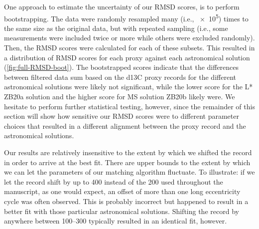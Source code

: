 \documentclass[draft]{agujournal2019}
\begin{document}
One approach to estimate the uncertainty of our \gls{RMSD} scores, is to perform bootstrapping.
The data were randomly resampled many (i.e., \num{e5}) times to the same size as the original data, but with repeated sampling (i.e., some measurements were included twice or more while others were excluded randomly).
Then, the \gls{RMSD} scores were calculated for each of these subsets.
This resulted in a distribution of \gls{RMSD} scores for each proxy against each astronomical solution (\cref{fig:full-RMSD-boot}).
The bootstrapped scores indicate that the differences between filtered data sum based on the \gls{d13C} proxy records for the different astronomical solutions were likely not significant,
while the lower score for the \gls{L*} ZB20a solution
and the higher score for \gls{MS} solution ZB20b
likely were.
We hesitate to perform further statistical testing, however, since the remainder of this section will show how sensitive our \gls{RMSD} scores were to different parameter choices that resulted in a different alignment between the proxy record and the astronomical solutions.

Our results are relatively insensitive to the extent by which we shifted the record in order to arrive at the best fit.
There are upper bounds to the extent by which we can let the parameters of our matching algorithm fluctuate.
To illustrate: if we let the record shift by up to \qty{400}{\kiloyear} instead of the \qty{200}{\kiloyear} used throughout the manuscript, as one would expect, an offset of more than one long eccentricity cycle was often observed.
This is probably incorrect but happened to result in a better fit with those particular astronomical solutions.
Shifting the record by anywhere between \qtyrange{100}{300}{\kiloyear} typically resulted in an identical fit, however.
\end{document}
